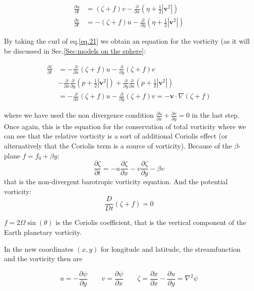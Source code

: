\[\begin{aligned}
\frac{\partial u}{\partial t} &= (\zeta +f) v -\frac{\partial }{\partial x}(\eta+\frac{1}{2}|\mathbf{v}^2|)\\
\frac{\partial v}{\partial t} &= -(\zeta +f) u -\frac{\partial }{\partial y}(\eta+\frac{1}{2}|\mathbf{v}^2|)
\end{aligned}\]

By taking the curl of eq.\ref{eq.21} we obtain an equation for the vorticity (as it will be discussed in Sec.\ref{Sec:models on the sphere}:

\[\begin{aligned}
\frac{\partial \zeta}{\partial t} &= -\frac{\partial }{\partial x}(\zeta +f) u -\frac{\partial }{\partial y}(\zeta +f) v  \\
&-\frac{\partial }{\partial x} \frac{\partial }{\partial y}(p+\frac{1}{2}|\mathbf{v}^2|) +\frac{\partial }{\partial y}\frac{\partial }{\partial x}(p+\frac{1}{2}|\mathbf{v}^2|) \\
&=  -\frac{\partial }{\partial x}(\zeta +f) u -\frac{\partial }{\partial y}(\zeta +f) v = -\mathbf{v}\cdot\nabla(\zeta +f)
\end{aligned}\]

where we have used the non divergence condition
\(\frac{\partial u}{\partial x}+\frac{\partial v}{\partial y}=0\) in the
last step. Once again, this is the equation for the conservation of
total vorticity where we can see that the relative vorticity is a sort
of additional Coriolis effect (or alternatively that the Coriolis term
is a source of vorticity). Because of the $\beta$-plane $f=f_0+\beta y$: 
\begin{equation}\label{Barotropic equation}
    \frac{\partial\zeta}{\partial t}=-u\frac{\partial\zeta}{\partial x}-v\frac{\partial\zeta}{\partial y}-\beta v
\end{equation}
that is the non-divergent barotropic vorticity equation. And the potential vorticity:
\begin{equation}\label{eq.potential vorticity}
    \frac{D}{Dt}(\zeta +f)=0
\end{equation}

\(f= 2\Omega \sin(\theta)\) is the Coriolis coefficient, that is the
vertical component of the Earth planetary vorticity. 

In the new coordinates \((x,y)\) for longitude and latitude, the
streamfunction and the vorticity then are

\[u=-\frac{\partial \psi}{\partial y}\qquad v=\frac{\partial \psi}{\partial x} \qquad
\zeta = \frac{\partial x}{\partial x} -\frac{\partial u}{\partial y}=\nabla^2\psi\]

